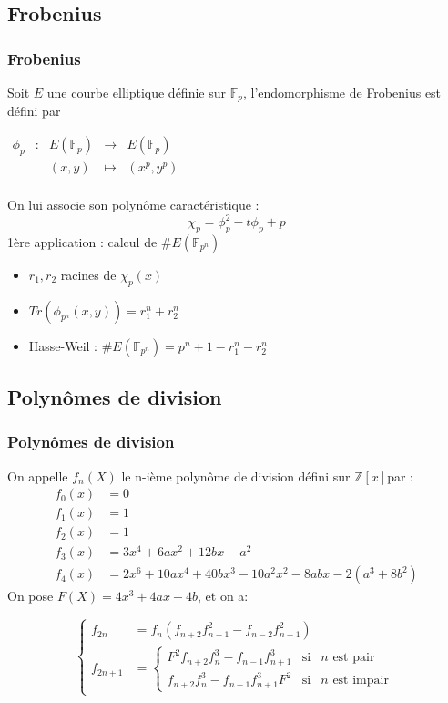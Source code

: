 \documentclass[french]{beamer}
\begin{document}
\subsection{Frobenius}
\begin{frame}
\frametitle{Frobenius}
Soit $E$ une courbe elliptique définie sur $\mathbb{F}_p$, l'endomorphisme de Frobenius est défini par 

$\begin{array}{ccccc}
\phi_p & : & E(\mathbb{F}_p) & \to & E(\mathbb{F}_p) \\
 & & (x,y) & \mapsto & (x^p, y^p) \\
\end{array}$

On lui associe son polynôme caractéristique :
\begin{equation*}
\chi_p = \phi_p^2 - t \phi_p + p 
\end{equation*}
1ère application : calcul de $\#E(\mathbb{F}_{p^n})$
\begin{itemize}
\item $r_1,r_2$ racines de $\chi_p(x)$
\item $Tr(\phi_{p^n}(x,y)) = r_1^n + r_2^n$
\item Hasse-Weil : $\#E(\mathbb{F}_{p^n}) = p^n +1 - r_1^n -r_2^n$
\end{itemize}
\end{frame}

\subsection{Polynômes de division}
\begin{frame}
\frametitle{Polynômes de division}
On appelle $f_n(X)$ le n-ième polynôme de division défini sur $\mathbb{Z}[x]$par : 
\begin{align*}
f_0(x) &= 0 \\
f_1(x) &= 1 \\
f_2(x) &= 1 \\
f_3(x) &= 3x^4 + 6ax^2 +12bx - a^2 \\
f_4(x) &= 2x^6 + 10ax^4 +40bx^3 - 10a^2x^2 - 8abx - 2(a^3 + 8b^2)
\end{align*}
On pose $F(X)= 4x^3 + 4ax + 4b$, et on a:

\begin{equation}
\left\lbrace
\begin{array}{ll}
f_{2n}& =  f_n(f_{n+2}f_{n-1}^2 - f_{n-2}f_{n+1}^2)   \\
f_{2n+1}& = \left\lbrace 
\begin{array}{ccc}
F^2f_{n+2}f_n^3 - f_{n-1}f_{n+1}^3 & \mbox{si} & n \text{ est pair}\\
f_{n+2}f_n^3 - f_{n-1}f_{n+1}^3F^2 & \mbox{si} & n \text{ est impair} \end{array}\right.

\end{array} \right.
\end{equation} 
\end{frame}
\end{document}
